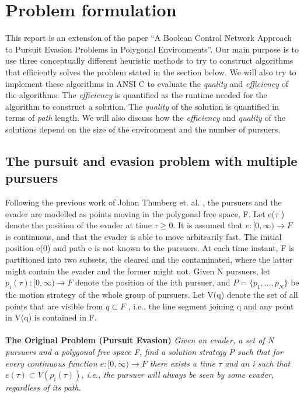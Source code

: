 \chapter{Problem formulation}

This report is an extension of the paper ``A Boolean Control Network Approach to Pursuit Evasion Problems in Polygonal Environments''\cite{paper1}. Our main purpose is to use three conceptually different heuristic methods to try to construct algorithms that efficiently solves the problem stated in the section below. We will also try to implement these algorithms in ANSI C to evaluate the \emph{quality} and \emph{efficiency} of the algorithms. The \emph{efficiency} is quantified as the runtime needed for the algorithm to construct a solution. The \emph{quality} of the solution is quantified in terms of \emph{path} length. We will also discuss how the \emph{efficiency} and \emph{quality} of the solutions depend on the size of the environment and the number of pursuers.
\section {The pursuit and evasion problem with multiple pursuers}
Following the previous work of Johan Thunberg  et. al. \cite{paper1}, the pursuers and the evader are modelled as points moving in the polygonal free space, F. Let  e($\tau$ ) denote the position of the evader at time $\tau \geq 0$. It is assumed that $e : \lbrack 0, \infty) \to F$ is continuous, and that the evader is able to move arbitrarily fast. The initial position e(0) and path e is not known to the pursuers. At each time instant, F is partitioned into two subsets, the cleared and the contaminated, where the latter might contain the evader and the former might not. Given N pursuers, let $p_i (\tau ) : \lbrack 0, \infty) \to F$ denote the position of the i:th pursuer, and $P = \lbrace p_1 , . . . , p_N \rbrace$ be the motion strategy of the whole group of pursuers. Let V(q) denote the set of all points that are visible from $q \subset F$ , i.e., the line segment joining q and any point in V(q) is contained in F.\\
\\
\textbf{The Original Problem (Pursuit Evasion)} \emph{ Given an evader, a set of N pursuers and a polygonal free space F, find a solution strategy P such that for every continuous function $e : \lbrack 0, \infty) \to F$ there exists a time $\tau$ and an i such that $e(\tau ) \subset V (p_i (\tau ))$, i.e., the pursuer will always be seen by some evader, regardless of its path. }


